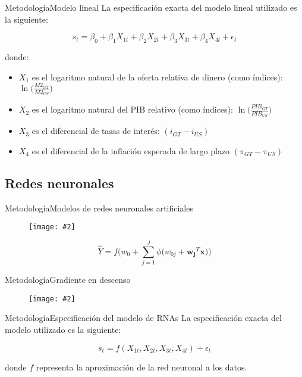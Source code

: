\documentclass{beamer}
\newcommand{\figura}[2]{
	\begin{figure}
		\centering
		\texttt{[image: \#2]}
	\end{figure}	
}
\begin{document}
\begin{frame}{Metodología}{Modelo lineal}
	La especificación exacta del modelo lineal utilizado es la siguiente:
	
	\begin{equation}
	s_t = \beta_0 + \beta_1 X_{1t} + \beta_2 X_{2t} + \beta_3 X_{3t} + \beta_4 X_{4t} + \epsilon_t
	\label{linearModel}
	\end{equation}
	
	donde:
	
	\begin{itemize}
		\item $X_1$ es el logaritmo natural de la oferta relativa de dinero (como índices): $ \ln \big ( \frac{M2_{GT}}{M2_{US}} \big) $
		
		\item $X_2$ es el logaritmo natural del PIB relativo (como índices): $ \ln \big ( \frac{PIB_{GT}}{PIB_{US}} \big) $
		
		\item $X_3$ es el diferencial de tasas de interés: $ ( i_{GT} - i_{US} ) $
		
		\item $X_4$ es el diferencial de la inflación esperada de largo plazo $ ( \pi_{GT} - \pi_{US} ) $
		
	\end{itemize}
\end{frame}

\subsection{Redes neuronales}

\begin{frame}{Metodología}{Modelos de redes neuronales artificiales}
	\figura{0.6}{figuras/neuralNetwork.pdf}
	
	\begin{equation}
	\hat{Y} = f \bigg ( w_0 + \sum_{j=1}^{J} \phi \big ( w_{0j} + \mathbf{w_j}^T \mathbf{x} \big )\bigg )
	\label{ann_model}
	\end{equation}
\end{frame}

\begin{frame}{Metodología}{Gradiente en descenso}
	\figura{1}{figuras/BackPropAlg.png}
\end{frame}


\begin{frame}{Metodología}{Especificación del modelo de RNAs}
	La especificación exacta del modelo utilizado es la siguiente:
	
	\begin{equation}
	s_t = f(X_{1t}, X_{2t}, X_{3t}, X_{4t}) + \epsilon_t
	\label{annModel}
	\end{equation}
	
	donde $f$ representa la aproximación de la red neuronal a los datos.\\
	
\end{frame}
\end{document}
